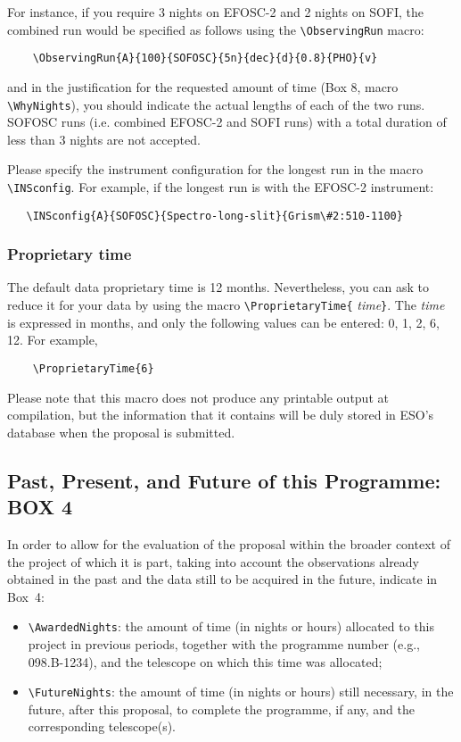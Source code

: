 \documentclass{article}
\begin{document}
For instance, if you require 3 nights on EFOSC-2 and 2 nights on SOFI, the
combined run would be specified as follows using the \verb|\ObservingRun|
 macro:
\begin{verbatim}
    \ObservingRun{A}{100}{SOFOSC}{5n}{dec}{d}{0.8}{PHO}{v}
\end{verbatim}

and in the justification for the requested amount of time
(Box 8, macro \verb|\WhyNights|), you should indicate the actual
lengths of each of the two runs. 
SOFOSC runs (i.e. combined EFOSC-2 and SOFI runs)  with a
total duration of less than 3 nights are not accepted.

Please specify the instrument configuration for the longest run
in the macro \verb|\INSconfig|. For example, if the longest run
is with the EFOSC-2 instrument:
\begin{verbatim}
   \INSconfig{A}{SOFOSC}{Spectro-long-slit}{Grism\#2:510-1100}
\end{verbatim}

\subsubsection*{Proprietary time} 
The default data proprietary time is 12 months.  Nevertheless, you can
ask to reduce it for 
your data by using the macro \verb|\ProprietaryTime{|{\it
    time\/}\verb|}|.  The {\it time\/} is expressed in months, and
only the following values can be entered:  0, 1, 2, 6, 12.  For
example, 
\begin{verbatim}
    \ProprietaryTime{6}
\end{verbatim}

Please note that this macro does not produce any printable output at
compilation, but the information that it contains will be duly stored
in ESO's database when the proposal is submitted.

\subsection{Past, Present, and Future of this Programme:  {\bf BOX 4}}

In order to allow for the evaluation of the proposal within the
broader context of the project of which it is part, taking into
account the observations already obtained in the past and the data
still to be acquired in the future, indicate in Box~4:
\begin{itemize}
\item \verb|\AwardedNights|: the amount of time (in nights or hours)
  allocated to this project in previous periods, together with the
  programme number (e.g., 098.B-1234), and the telescope
  on which this time was allocated;
\item \verb|\FutureNights|: the amount of time (in nights or hours)
  still necessary, in the future, after this proposal, to complete the
  programme, if any, and the corresponding telescope(s). 
\end{itemize}
\end{document}
